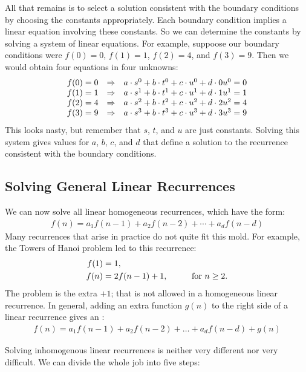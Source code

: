 All that remains is to select a solution consistent with the boundary
conditions by choosing the constants appropriately. Each boundary
condition implies a linear equation involving these constants. So we
can determine the constants by solving a system of linear
equations. For example, suppoose our boundary conditions were $f(0) =
0$, $f(1) = 1$, $f(2) = 4$, and $f(3) = 9$.  Then we would obtain four
equations in four unknowns:
\[
\begin{array}{r@{\quad\Rightarrow\quad}l}
f(0) = 0 & a \cdot s^0 + b \cdot t^0 + c \cdot u^0 +d \cdot
0u^0 = 0 \\
f(1) = 1 & a \cdot s^1 + b \cdot t^1 + c \cdot u^1 +d \cdot
1u^1 = 1 \\
f(2) = 4 & a \cdot s^2 + b \cdot t^2 + c \cdot u^2 +d \cdot
2u^2 = 4 \\
f(3) = 9 & a \cdot s^3 + b \cdot t^3 + c \cdot u^3 +d \cdot
3u^3 = 9
\end{array}
\]
This looks nasty, but remember that $s$, $t$, and $u$ are just
constants. Solving this system gives values for $a$, $b$, $c$, and $d$
that define a solution to the recurrence consistent with the boundary
conditions.

\subsection{Solving General Linear Recurrences}

We can now solve all linear homogeneous recurrences, which have the
form:
\begin{align*}
f(n) = a_1 f(n-1) + a_2 f(n-2) + \cdots + a_d f(n - d)
\end{align*}
Many recurrences that arise in practice do not quite fit this mold.
For example, the Towers of Hanoi problem led to this recurrence:
\begin{align*}
f(1) & = 1, \\
f(n) & = 2 f(n - 1) + 1, & \text{\qquad for $n \geq 2$}.
\end{align*}
The problem is the extra $+1$; that is not allowed in a homogeneous
linear recurrence.  In general, adding an extra function $g(n)$ to the
right side of a linear recurrence gives an :
\begin{align*}
f(n) = a_1 f(n-1) + a_2 f(n-2) + \ldots + a_d f(n - d) + g(n)
\end{align*}

Solving inhomogenous linear recurrences is neither very different nor
very difficult. We can divide the whole job into five steps:

